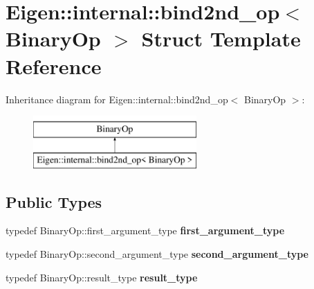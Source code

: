 \hypertarget{struct_eigen_1_1internal_1_1bind2nd__op}{}\section{Eigen\+::internal\+::bind2nd\+\_\+op$<$ Binary\+Op $>$ Struct Template Reference}
\label{struct_eigen_1_1internal_1_1bind2nd__op}
Inheritance diagram for Eigen\+::internal\+::bind2nd\+\_\+op$<$ Binary\+Op $>$\+:\begin{figure}[H]
\begin{center}
\leavevmode
\includegraphics[height=2.000000cm]{struct_eigen_1_1internal_1_1bind2nd__op}
\end{center}
\end{figure}
\subsection*{Public Types}
\begin{DoxyCompactItemize}
\item 
\mbox{\label{struct_eigen_1_1internal_1_1bind2nd__op_a4adfa0f8948a383979d3c5aa83d0dd94}} 
typedef Binary\+Op\+::first\+\_\+argument\+\_\+type {\bfseries first\+\_\+argument\+\_\+type}
\item 
\mbox{\label{struct_eigen_1_1internal_1_1bind2nd__op_a70aef800d3ea7ae665c4d671c49a3b73}} 
typedef Binary\+Op\+::second\+\_\+argument\+\_\+type {\bfseries second\+\_\+argument\+\_\+type}
\item 
\mbox{\label{struct_eigen_1_1internal_1_1bind2nd__op_ad97adf3801d80deece8c22de5033a3d5}} 
typedef Binary\+Op\+::result\+\_\+type {\bfseries result\+\_\+type}
\end{DoxyCompactItemize}
